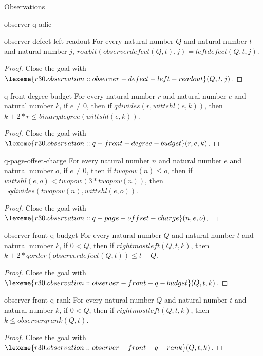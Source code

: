 \begin{lexlean}{Observations}
\begin{section}{observer-q-adic}
\begin{theorem}{observer-defect-left-readout}
For every natural number \(Q\) and natural number \(t\) and natural number \(j\), \(rowbit(observerdefect(Q, t), j) = leftdefect(Q, t, j)\).
\begin{proof}
Close the goal with \(\lexeme{r30.observation::observer-defect-left-readout}(Q, t, j)\).
\end{proof}
\end{theorem}

\begin{theorem}{q-front-degree-budget}
For every natural number \(r\) and natural number \(e\) and natural number \(k\), if \(e ≠ 0\), then if \(qdivides(r, wittshl(e, k))\), then \(k + 2 * r ≤ binarydegree(wittshl(e, k))\).
\begin{proof}
Close the goal with \(\lexeme{r30.observation::q-front-degree-budget}(r, e, k)\).
\end{proof}
\end{theorem}

\begin{theorem}{q-page-offset-charge}
For every natural number \(n\) and natural number \(e\) and natural number \(o\), if \(e ≠ 0\), then if \(twopow(n) ≤ o\), then if \(wittshl(e, o) < twopow(3 * twopow(n))\), then \(¬ qdivides(twopow(n), wittshl(e, o))\).
\begin{proof}
Close the goal with \(\lexeme{r30.observation::q-page-offset-charge}(n, e, o)\).
\end{proof}
\end{theorem}

\begin{theorem}{observer-front-q-budget}
For every natural number \(Q\) and natural number \(t\) and natural number \(k\), if \(0 < Q\), then if \(rightmostleft(Q, t, k)\), then \(k + 2 * qorder(observerdefect(Q, t)) ≤ t + Q\).
\begin{proof}
Close the goal with \(\lexeme{r30.observation::observer-front-q-budget}(Q, t, k)\).
\end{proof}
\end{theorem}

\begin{theorem}{observer-front-q-rank}
For every natural number \(Q\) and natural number \(t\) and natural number \(k\), if \(0 < Q\), then if \(rightmostleft(Q, t, k)\), then \(k ≤ observerqrank(Q, t)\).
\begin{proof}
Close the goal with \(\lexeme{r30.observation::observer-front-q-rank}(Q, t, k)\).
\end{proof}
\end{theorem}


\end{section}
\end{lexlean}
